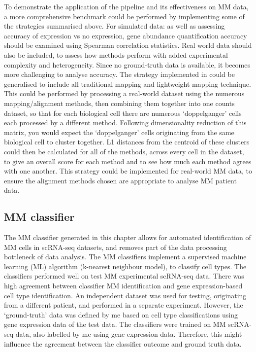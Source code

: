 To demonstrate the application of the pipeline and its effectiveness on MM data, a more comprehensive benchmark could be performed by implementing some of the strategies summarised above.
For simulated data: as well as assessing accuracy of expression vs no expression, gene abundance quantification accuracy should be examined using Spearman correlation statistics.
Real world data should also be included, to assess how methods perform with added experimental complexity and heterogeneity.
Since no ground-truth data is available, it becomes more challenging to analyse accuracy.
The strategy implemented in \cite{booeshaghi2021benchmarking} could be generalised to include all traditional mapping and lightweight mapping technique.
This could be performed by processing a real-world dataset using the numerous mapping/alignment methods, then combining them together into one counts dataset, so that for each biological cell there are numerous `doppelganger' cells each processed by a different method.
Following dimensionality reduction of this matrix, you would expect the `doppelganger' cells originating from the same biological cell to cluster together.
L1 distances from the centroid of these clusters could then be calculated for all of the methods, across every cell in the dataset, to give an overall score for each method and to see how much each method agrees with one another.
This strategy could be implemented for real-world MM data, to ensure the alignment methods chosen are appropriate to analyse MM patient data.

\subsection{MM classifier}\label{subsec:mm_class_diss}
The MM classifier generated in this chapter allows for automated identification of MM cells in scRNA-seq datasets, and removes part of the data processing bottleneck of data analysis.
The MM classifiers implement a supervised machine learning (ML) algorithm (k-nearest neighbour model), to classify cell types.
The classifiers performed well on test MM experimental scRNA-seq data.
There was high agreement between classifier MM identification and gene expression-based cell type identification.
An independent dataset was used for testing, originating from a different patient, and performed in a separate experiment.
However, the `ground-truth' data was defined by me based on cell type classifications using gene expression data of the test data.
The classifiers were trained on MM scRNA-seq data, also labelled by me using gene expression data.
Therefore, this might influence the agreement between the classifier outcome and ground truth data.

